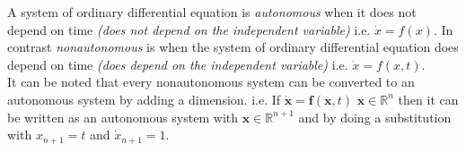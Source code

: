 \documentclass[12pt]{article}
\begin{document}
A system of ordinary differential equation is \emph{autonomous} when it does not depend on time \textit{(does not depend on the independent variable)} i.e. $\dot{x}=f(x)$.  In contrast \emph{nonautonomous} is when the system of ordinary differential equation does depend on time \textit{(does depend on the independent variable)} i.e. $\dot{x}=f(x,t)$.\\

It can be noted that every nonautonomous system can be converted to an autonomous system by adding a dimension. i.e. If $\dot{\textbf{x}}=\textbf{f}(\textbf{x},t)$ $\textbf{x} \in \mathbb{R}^n$ then it can be written as an autonomous system with $\textbf{x} \in \mathbb{R}^{n+1}$ and by doing a substitution with $x_{n+1} = t$ and $\dot{x}_{n+1}=1$.
\end{document}
